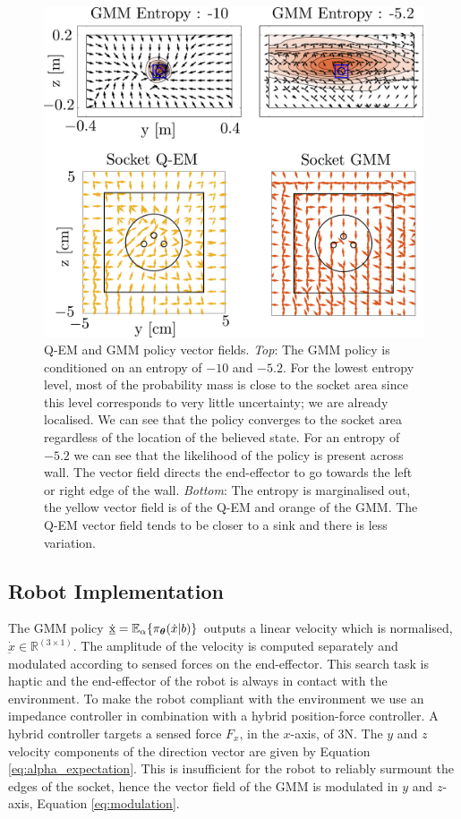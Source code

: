 \begin{figure}
   \includegraphics[width=\textwidth]{./ch4-PiH/Figures/Fig/policy_vf.pdf}
  \caption{Q-EM and GMM policy vector fields. \textit{Top}: The GMM policy is conditioned on an entropy of $-10$ and $-5.2$. For the lowest entropy level,
  most of the probability mass is close to the socket area since this level corresponds to very little uncertainty; we are already localised. We can see 
  that the policy converges to the socket area regardless of the location of the believed state. For an entropy of $-5.2$ we can see that 
  the likelihood of the policy is present across wall. The vector field directs the end-effector to go towards the left or right edge of the wall. 
  \textit{Bottom}: The entropy is marginalised out, the yellow vector field is of the Q-EM and orange of the GMM. The Q-EM vector field tends 
  to be closer to a sink and there is less variation.}
  \label{fig:policy_vf}
\end{figure}


\subsection{Robot Implementation}

The GMM policy $\dot{\underbar{x}} = \mathbb{E}_{\alpha}\{\pi_{\boldsymbol{\theta}}(\dot{x}|b)\}$ outputs a linear velocity which is normalised, $\dot{\underbar{x}} \in \mathbb{R}^{(3 \times 1)}$. 
The amplitude of the velocity is computed separately and modulated according to sensed forces on the end-effector.
This search task is haptic and the end-effector of the robot is always in contact with the environment. To make the robot
compliant with the environment we use an impedance controller in combination with a hybrid position-force controller. A hybrid controller
targets a sensed force $F_x$, in the $x$-axis, of 3N. The $y$ and $z$ velocity components of the direction vector are given by 
Equation \ref{eq:alpha_expectation}. This is insufficient for the robot to reliably surmount the edges of the socket,
hence the vector field of the GMM is modulated in $y$ and $z$-axis, Equation \ref{eq:modulation}.

